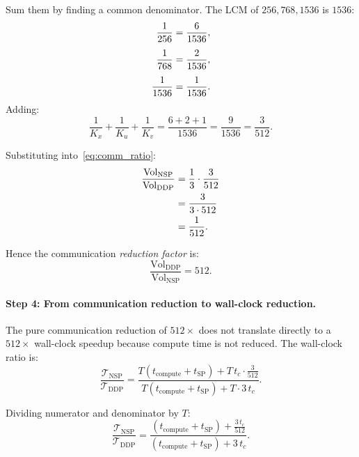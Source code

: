 \documentclass{article}
\begin{document}
Sum them by finding a common denominator. The LCM of $256, 768, 1536$ is
$1536$:
\begin{align}
\frac{1}{256} &= \frac{6}{1536}, \notag \\[4pt]
\frac{1}{768} &= \frac{2}{1536}, \notag \\[4pt]
\frac{1}{1536} &= \frac{1}{1536}. \notag
\end{align}
Adding:
\begin{equation}
\frac{1}{K_x} + \frac{1}{K_u} + \frac{1}{K_v}
= \frac{6 + 2 + 1}{1536}
= \frac{9}{1536}
= \frac{3}{512}.
\label{eq:sum_recip}
\end{equation}

Substituting into~\eqref{eq:comm_ratio}:
\begin{align}
\frac{\text{Vol}_{\text{NSP}}}{\text{Vol}_{\text{DDP}}}
&= \frac{1}{3} \cdot \frac{3}{512}
\notag \\
&= \frac{3}{3 \cdot 512}
\notag \\
&= \frac{1}{512}.
\label{eq:comm_ratio_computed}
\end{align}

Hence the communication \emph{reduction factor} is:
\begin{equation}
\frac{\text{Vol}_{\text{DDP}}}{\text{Vol}_{\text{NSP}}}
= 512.
\label{eq:reduction_pure}
\end{equation}

\paragraph{Step 4: From communication reduction to wall-clock reduction.}

The pure communication reduction of $512\times$ does not translate directly
to a $512\times$ wall-clock speedup because compute time is not reduced.
The wall-clock ratio is:
\begin{equation}
\frac{\mathcal{T}_{\text{NSP}}}{\mathcal{T}_{\text{DDP}}}
= \frac{T(t_{\text{compute}} + t_{\text{SP}})
  + T\,t_c \cdot \frac{3}{512}}
{T(t_{\text{compute}} + t_{\text{SP}}) + T \cdot 3\,t_c}.
\label{eq:wallclock_ratio}
\end{equation}

Dividing numerator and denominator by $T$:
\begin{equation}
\frac{\mathcal{T}_{\text{NSP}}}{\mathcal{T}_{\text{DDP}}}
= \frac{(t_{\text{compute}} + t_{\text{SP}})
  + \frac{3\,t_c}{512}}
{(t_{\text{compute}} + t_{\text{SP}}) + 3\,t_c}.
\label{eq:wallclock_ratio_simplified}
\end{equation}
\end{document}
